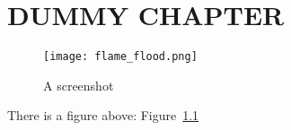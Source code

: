 \chapter{DUMMY CHAPTER}
\begin{figure}[H]
  \centering
  \texttt{[image: flame\_flood.png]}
  \caption{A screenshot}\label{fig:1}
\end{figure}
There is a figure above: Figure~\ref{fig:1}